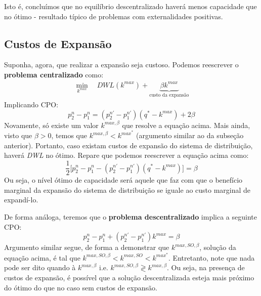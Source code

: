 Isto é, concluímos que no equilíbrio descentralizado haverá menos capacidade que no ótimo - resultado típico de problemas com externalidades positivas.

\subsection{Custos de Expansão}
Suponha, agora, que realizar a expansão seja custoso. Podemos reescrever o \textbf{problema centralizado} como:
\begin{align*}
    \min_{k^{max}}\quad \textit{DWL}(k^{max}) + \underbrace{\beta k^{max}}_{\text{custo da expansão}}
\end{align*}
Implicando CPO:
\[p_2^n-p_1^n = (p_2^{n'}-p_1^{n'})(q^*-k^{max})+2\beta\]
Novamente, só existe um valor $k^{max,\beta}$ que resolve a equação acima. Mais ainda, visto que $\beta>0$, temos que  $k^{max,\beta}<k^{max^*}$ (argumento similar ao da subseção anterior). Portanto, caso existam custos de expansão do sistema de distribuição, haverá \textit{DWL} no ótimo. Repare que podemos reescrever a equação acima como:
\[\frac{1}{2}\Big[p_2^n-p_1^n - (p_2^{n'}-p_1^{n'})(q^*-k^{max})\Big]=\beta\]
Ou seja, o nível ótimo de capacidade será aquele que faz com que o benefício marginal da expansão do sistema de distribuição se iguale ao custo marginal de expandí-lo.

De forma análoga, teremos que o \textbf{problema descentralizado} implica a seguinte CPO:
\[p_2^n-p_1^n+(p_2^{n'}-p_1^{n'})k^{max}=\beta\]
Argumento similar segue, de forma a demonstrar que $k^{max,SO,\beta}$, solução da equação acima, é tal que $k^{max,SO,\beta}<k^{max,SO}<k^{max^*}$. Entretanto, note que nada pode ser dito quando à $k^{max,\beta}$ i.e. $k^{max,SO,\beta}\gtrless k^{max,\beta}$. Ou seja, na presença de custos de expansão, é possível que a solução descentralizada esteja mais próximo do ótimo do que no caso sem custos de expansão. 